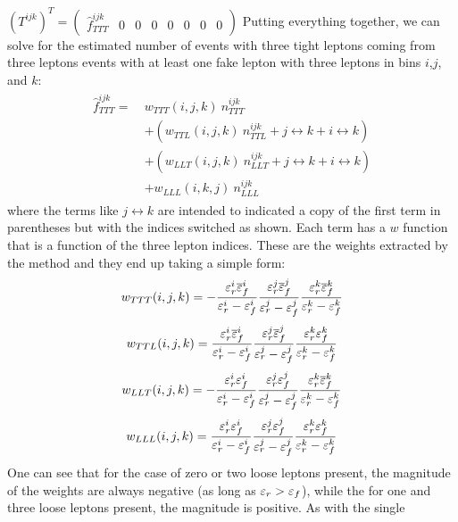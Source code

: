 $(T^{ijk})^T=\begin{pmatrix} 
  \hat{f}_{TTT}^{ijk}& 0 & 0 & 0 & 0 & 0 & 0 & 0 
  \end{pmatrix}$
Putting everything together, we can solve for the estimated
number of events with three tight leptons 
coming from three leptons events with at least one fake lepton
with three leptons in bins $i$,$j$, and $k$:
\begin{align}
\begin{split}
\label{eq:mxm_threeleptons}
\hat{f}^{ijk}_{TTT} = ~& w_{TTT}(i,j,k)~n^{ijk}_{TTT}  \\
   &+(w_{TTL}(i,j,k)~n^{ijk}_{TTL} + j\leftrightarrow k + i \leftrightarrow k)\\
   &+(w_{LLT}(i,j,k)~n^{ijk}_{LLT} + j\leftrightarrow k + i \leftrightarrow k) \\
   &+w_{LLL}(i,k,j)~n^{ijk}_{LLL}
\end{split}
\end{align}
where the terms like $j\leftrightarrow k$ are intended to indicated
a copy of the first term in parentheses but with the indices 
switched as shown. Each term has a $w$ function that is a function
of the three lepton indices. These are the weights
extracted by the method and they end up taking a simple form:
\begin{equation}
\label{eq:mxm_wttt}
w_{TTT}(i,j,k) = 
-\frac{\varepsilon_r^i\overline{\varepsilon}_f^i}{\varepsilon_r^i-\varepsilon_f^i}
\frac{\varepsilon_r^j\overline{\varepsilon}_f^j}{\varepsilon_r^j-\varepsilon_f^j}
\frac{\varepsilon_r^k\overline{\varepsilon}_f^k}{\varepsilon_r^k-\varepsilon_f^k}
\end{equation}
\begin{equation}
\label{eq:mxm_wttl}
w_{TTL}(i,j,k) = 
\frac{\varepsilon_r^i\overline{\varepsilon}_f^i}{\varepsilon_r^i-\varepsilon_f^i}
\frac{\varepsilon_r^j\overline{\varepsilon}_f^j}{\varepsilon_r^j-\varepsilon_f^j}
\frac{\varepsilon_r^k\varepsilon_f^k}{\varepsilon_r^k-\varepsilon_f^k}
\end{equation}
\begin{equation}
\label{eq:mxm_wllt}
w_{LLT}(i,j,k) =  
- \frac{\varepsilon_r^i\varepsilon_f^i}{\varepsilon_r^i-\varepsilon_f^i}
\frac{\varepsilon_r^j\varepsilon_f^j}{\varepsilon_r^j-\varepsilon_f^j}
\frac{\varepsilon_r^k\overline{\varepsilon}_f^k}{\varepsilon_r^k-\varepsilon_f^k}
\end{equation}
\begin{equation}
\label{eq:mxm_wlll}
w_{LLL}(i,j,k) =  
\frac{\varepsilon_r^i\varepsilon_f^i}{\varepsilon_r^i-\varepsilon_f^i}
\frac{\varepsilon_r^j\varepsilon_f^j}{\varepsilon_r^j-\varepsilon_f^j}
\frac{\varepsilon_r^k\varepsilon_f^k}{\varepsilon_r^k-\varepsilon_f^k}
\end{equation}
One can see that for the case of zero or two loose leptons present, 
the magnitude of the weights are always negative (as long
as $\varepsilon_r > \varepsilon_f$), while the for one and three loose leptons 
present, the magnitude is positive. As with the single
